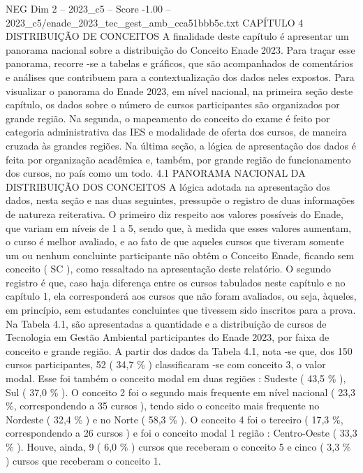 \begin{textsample}{NEG Dim 2 – 2023\_c5 – Score -1.00 – 2023\_c5/enade\_2023\_tec\_gest\_amb\_cca51bbb5c.txt}  \label{ex:f2_neg_175}
CAPÍTULO 4 DISTRIBUIÇÃO DE CONCEITOS A finalidade deste capítulo é apresentar um panorama nacional sobre a distribuição do Conceito Enade 2023.
Para traçar esse panorama, recorre -se a tabelas e gráficos, que são acompanhados de comentários e análises que contribuem para a contextualização dos dados neles expostos.
Para visualizar o panorama do Enade 2023, em nível nacional, na primeira seção deste capítulo, os dados sobre o número de cursos participantes são organizados por grande região.
Na segunda, o mapeamento do conceito do exame é feito por categoria administrativa das IES e modalidade de oferta dos cursos, de maneira cruzada às grandes regiões.
Na última seção, a lógica de apresentação dos dados é feita por organização acadêmica e, também, por grande região de funcionamento dos cursos, no país como um todo. 4.1 PANORAMA NACIONAL DA DISTRIBUIÇÃO DOS CONCEITOS A lógica adotada na apresentação dos dados, nesta seção e nas duas seguintes, pressupõe o registro de duas informações de natureza reiterativa.
O primeiro diz respeito aos valores possíveis do Enade, que variam em níveis de 1 a 5, sendo que, à medida que esses valores aumentam, o curso é melhor avaliado, e ao fato de que aqueles cursos que tiveram somente um ou nenhum concluinte participante não obtêm o Conceito Enade, ficando sem conceito ( SC ), como ressaltado na apresentação deste relatório.
O segundo registro é que, caso haja diferença entre os cursos tabulados neste capítulo e no capítulo 1, ela corresponderá aos cursos que não foram avaliados, ou seja, àqueles, em princípio, sem estudantes concluintes que tivessem sido inscritos para a prova.
Na Tabela 4.1, são apresentadas a quantidade e a distribuição de cursos de Tecnologia em Gestão Ambiental participantes do Enade 2023, por faixa de conceito e grande região.
A partir dos dados da Tabela 4.1, nota -se que, dos 150 cursos participantes, 52 ( 34,7 \% ) classificaram -se com conceito 3, o valor modal.
Esse foi também o conceito modal em duas regiões : Sudeste ( 43,5 \% ), Sul ( 37,0 \% ).
O conceito 2 foi o segundo mais frequente em nível nacional ( 23,3 \%, correspondendo a 35 cursos ), tendo sido o conceito mais frequente no Nordeste ( 32,4 \% ) e no Norte ( 58,3 \% ).
O conceito 4 foi o terceiro ( 17,3 \%, correspondendo a 26 cursos ) e foi o conceito modal 1 região : Centro-Oeste ( 33,3 \% ).
Houve, ainda, 9 ( 6,0 \% ) cursos que receberam o conceito 5 e cinco ( 3,3 \% ) cursos que receberam o conceito 1.

\end{textsample}
